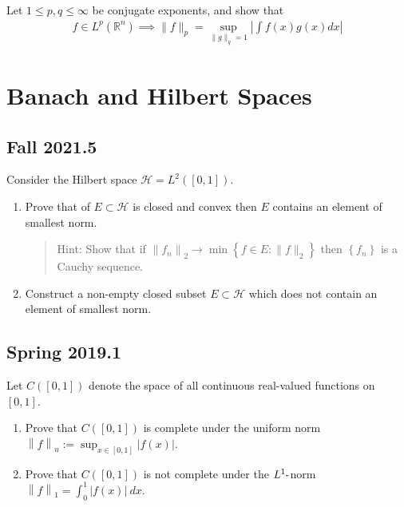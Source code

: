 Let \(1 \leq p,q \leq \infty\) be conjugate exponents, and show that
\begin{align*}
f \in L^p({\mathbb{R}}^n) \implies \|f\|_{p} = \sup _{\|g\|_{q}=1}\left|\int f(x) g(x) d x\right|
\end{align*}

\hypertarget{banach-and-hilbert-spaces}{%
\section{Banach and Hilbert Spaces}\label{banach-and-hilbert-spaces}}

\hypertarget{fall-2021.5}{%
\subsection{Fall 2021.5}\label{fall-2021.5}}

Consider the Hilbert space \(\mathcal{H}=L^{2}([0,1])\).

\begin{enumerate}
\def\labelenumi{\alph{enumi}.}
\item
  Prove that of \(E \subset \mathcal{H}\) is closed and convex then
  \(E\) contains an element of smallest norm.

  \begin{quote}
  Hint: Show that if
  \(\left\|f_{n}\right\|_{2} \rightarrow \min \left\{f \in E:\|f\|_{2}\right\}\)
  then \(\left\{f_{n}\right\}\) is a Cauchy sequence.
  \end{quote}
\item
  Construct a non-empty closed subset \(E \subset \mathcal{H}\) which
  does not contain an element of smallest norm.
\end{enumerate}

\hypertarget{spring-2019.1}{%
\subsection{Spring 2019.1}\label{spring-2019.1}}

Let \(C([0, 1])\) denote the space of all continuous real-valued
functions on \([0, 1]\).

\begin{enumerate}
\def\labelenumi{\alph{enumi}.}
\item
  Prove that \(C([0, 1])\) is complete under the uniform norm
  \({\left\lVert {f} \right\rVert}_u := \displaystyle\sup_{x\in [0,1]} |f (x)|\).
\item
  Prove that \(C([0, 1])\) is not complete under the
  \(L^1{\hbox{-}}\)norm
  \({\left\lVert {f} \right\rVert}_1 = \displaystyle\int_0^1 |f (x)| ~dx\).
\end{enumerate}

